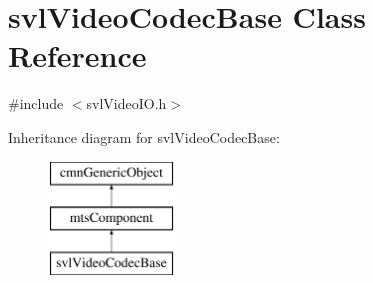 \hypertarget{classsvl_video_codec_base}{}\section{svl\+Video\+Codec\+Base Class Reference}
\label{classsvl_video_codec_base}


{\ttfamily \#include $<$svl\+Video\+I\+O.\+h$>$}

Inheritance diagram for svl\+Video\+Codec\+Base\+:\begin{figure}[H]
\begin{center}
\leavevmode
\includegraphics[height=3.000000cm]{d8/d39/classsvl_video_codec_base}
\end{center}
\end{figure}
